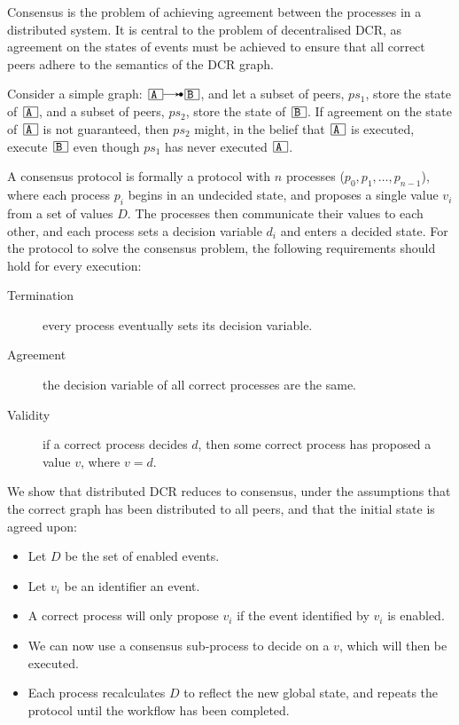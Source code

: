 \documentclass{article}
\begin{document}
		Consensus is the problem of achieving agreement between the processes in a distributed system.
		It is central to the problem of decentralised DCR, as agreement on the states of events must be achieved to ensure that all correct peers adhere to the semantics of the DCR graph.

		Consider a simple graph: $\ev{A} \crel \ev{B}$, and let a subset of peers, $ps_1$, store the state of $\ev{A}$, and a subset of peers, $ps_2$, store the state of $\ev{B}$.
		If agreement on the state of $\ev{A}$ is not guaranteed, then $ps_2$ might, in the belief that $\ev{A}$ is executed, execute $\ev{B}$ even though $ps_1$ has never executed $\ev{A}$.

		A consensus protocol is formally a protocol with $n$ processes ($p_0, p_1, \dots, p_{n-1}$), where each process $p_i$ begins in an undecided state, and proposes a single value $v_i$ from a set of values $D$. The processes then communicate their values to each other, and each process sets a decision variable $d_i$ and enters a decided state.
		For the protocol to solve the consensus problem, the following requirements should hold for every execution:
		\begin{description}
			\item[Termination] every process eventually sets its decision variable.
			\item[Agreement] the decision variable of all correct processes are the same.
			\item[Validity] if a correct process decides $d$, then some correct process has proposed a value $v$, where $v = d$.
		\end{description}

		We show that distributed DCR reduces to consensus, under the assumptions that the correct graph has been distributed to all peers, and that the initial state is agreed upon:
		\begin{itemize}
			\item Let $D$ be the set of enabled events.
			\item Let $v_i$ be an identifier an event.
			\item A correct process will only propose $v_i$ if the event identified by $v_i$ is enabled.
			\item We can now use a consensus sub-process to decide on a $v$, which will then be executed.
			\item Each process recalculates $D$ to reflect the new global state, and repeats the protocol until the workflow has been completed.
		\end{itemize}
\end{document}

